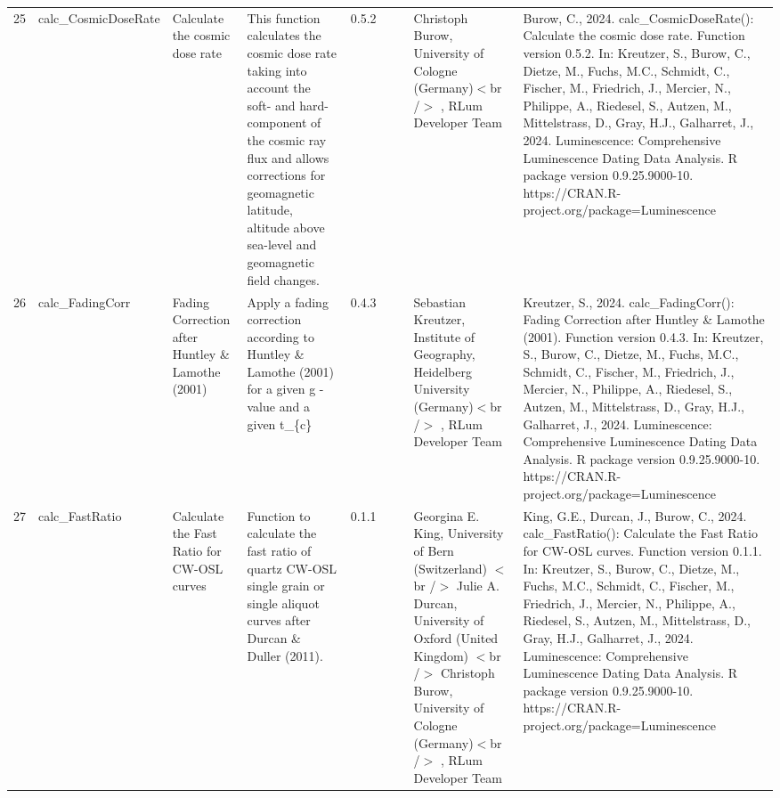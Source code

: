 \begin{table}[ht]
\begin{tabular}{rllllllll}
 \\ 
  25 & calc\_CosmicDoseRate & Calculate the cosmic dose rate & This function calculates the cosmic dose rate taking into account the soft- and hard-component of the cosmic ray flux and allows corrections for geomagnetic latitude, altitude above sea-level and geomagnetic field changes. & 0.5.2
 &  &  & Christoph Burow, University of Cologne (Germany)$<$br /$>$ , RLum Developer Team & Burow, C., 2024. calc\_CosmicDoseRate(): Calculate the cosmic dose rate. Function version 0.5.2. In: Kreutzer, S., Burow, C., Dietze, M., Fuchs, M.C., Schmidt, C., Fischer, M., Friedrich, J., Mercier, N., Philippe, A., Riedesel, S., Autzen, M., Mittelstrass, D., Gray, H.J., Galharret, J., 2024. Luminescence: Comprehensive Luminescence Dating Data Analysis. R package version 0.9.25.9000-10. https://CRAN.R-project.org/package=Luminescence
 \\ 
  26 & calc\_FadingCorr & Fading Correction after Huntley \& Lamothe (2001) & Apply a fading correction according to Huntley \& Lamothe (2001) for a given g -value and a given  t\_\{c\} & 0.4.3
 &  &  & Sebastian Kreutzer, Institute of Geography, Heidelberg University (Germany)$<$br /$>$ , RLum Developer Team & Kreutzer, S., 2024. calc\_FadingCorr(): Fading Correction after Huntley \& Lamothe (2001). Function version 0.4.3. In: Kreutzer, S., Burow, C., Dietze, M., Fuchs, M.C., Schmidt, C., Fischer, M., Friedrich, J., Mercier, N., Philippe, A., Riedesel, S., Autzen, M., Mittelstrass, D., Gray, H.J., Galharret, J., 2024. Luminescence: Comprehensive Luminescence Dating Data Analysis. R package version 0.9.25.9000-10. https://CRAN.R-project.org/package=Luminescence
 \\ 
  27 & calc\_FastRatio & Calculate the Fast Ratio for CW-OSL curves & Function to calculate the fast ratio of quartz CW-OSL single grain or single aliquot curves after Durcan \& Duller (2011). & 0.1.1
 &  &  & Georgina E. King, University of Bern (Switzerland)  $<$br /$>$ Julie A. Durcan, University of Oxford (United Kingdom)  $<$br /$>$ Christoph Burow, University of Cologne (Germany)$<$br /$>$ , RLum Developer Team & King, G.E., Durcan, J., Burow, C., 2024. calc\_FastRatio(): Calculate the Fast Ratio for CW-OSL curves. Function version 0.1.1. In: Kreutzer, S., Burow, C., Dietze, M., Fuchs, M.C., Schmidt, C., Fischer, M., Friedrich, J., Mercier, N., Philippe, A., Riedesel, S., Autzen, M., Mittelstrass, D., Gray, H.J., Galharret, J., 2024. Luminescence: Comprehensive Luminescence Dating Data Analysis. R package version 0.9.25.9000-10. https://CRAN.R-project.org/package=Luminescence

\end{tabular}
\end{table}
